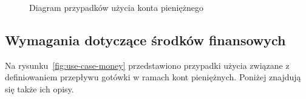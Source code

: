 \begin{figure}[h]
	\centering
	\caption{Diagram przypadków użycia konta pieniężnego}
	\label{fig:use-case-account}
\end{figure}

\subsection{Wymagania dotyczące środków finansowych}
\label{subsec:wymagania-srodki-finansowe}
Na rysunku~\ref{fig:use-case-money} przedstawiono przypadki użycia związane z definiowaniem przepływu gotówki w ramach kont pieniężnych. Poniżej znajdują się także ich opisy.

